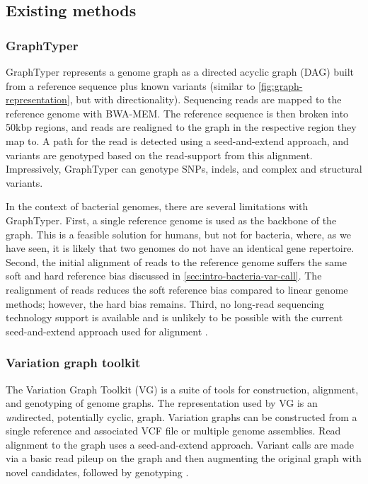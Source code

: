 \subsection{Existing methods}
\label{sec:graphs-existing}

\subsubsection{GraphTyper}
GraphTyper \cite{graphtyper,graphtyper2} represents a genome graph as a directed acyclic graph (DAG) built from a reference sequence plus known variants (similar to \autoref{fig:graph-representation}, but with directionality). Sequencing reads are mapped to the reference genome with BWA-MEM. The reference sequence is then broken into 50kbp regions, and reads are realigned to the graph in the respective region they map to. A path for the read is detected using a seed-and-extend approach, and variants are genotyped based on the read-support from this alignment. Impressively, GraphTyper can genotype SNPs, indels, and complex and structural variants.

In the context of bacterial genomes, there are several limitations with GraphTyper. First, a single reference genome is used as the backbone of the graph. This is a feasible solution for humans, but not for bacteria, where, as we have seen, it is likely that two genomes do not have an identical gene repertoire. Second, the initial alignment of reads to the reference genome suffers the same soft and hard reference bias discussed in \autoref{sec:intro-bacteria-var-call}. The realignment of reads reduces the soft reference bias compared to linear genome methods; however, the hard bias remains. Third, no long-read sequencing technology support is available and is unlikely to be possible with the current seed-and-extend approach used for alignment \cite{li2018}. 

\subsubsection{Variation graph toolkit}
The Variation Graph Toolkit (VG) \cite{vg2018} is a suite of tools for construction, alignment, and genotyping of genome graphs. The representation used by VG is an \emph{un}directed, potentially cyclic, graph. Variation graphs can be constructed from a single reference and associated VCF file or multiple genome assemblies. Read alignment to the graph uses a seed-and-extend approach. Variant calls are made via a basic read pileup on the graph and then augmenting the original graph with novel candidates, followed by genotyping \cite{Novak2017}.

